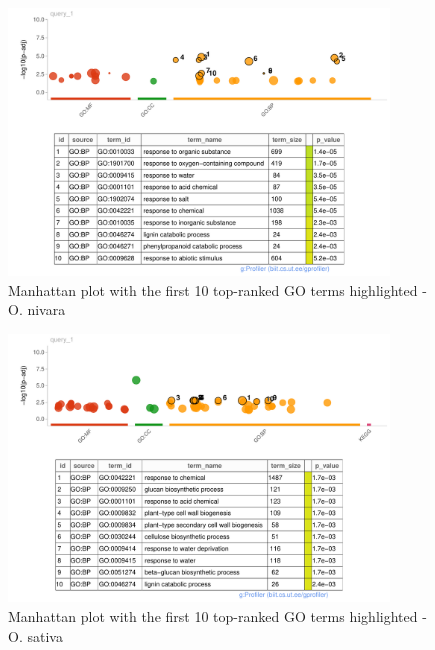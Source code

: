 \begin{figure}[htbp]
    \caption{Manhattan plot with the first 10 top-ranked GO terms highlighted - O. nivara}
    \label{fig:5.2-Gost-Plot-Oryza_nivara}
    \includegraphics[width=0.9\textwidth]{../../results/plots-and-tables/5.2-Gost-Plot-Oryza_nivara}
\end{figure}

\begin{figure}[htbp]
    \caption{Manhattan plot with the first 10 top-ranked GO terms highlighted - O. sativa}
    \label{fig:5.2-Gost-Plot-Oryza_sativa}
    \includegraphics[width=0.9\textwidth]{../../results/plots-and-tables/5.2-Gost-Plot-Oryza_sativa}
\end{figure}